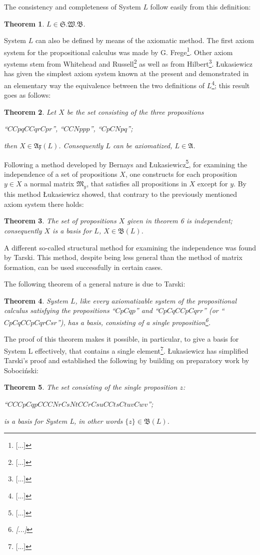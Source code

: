 \documentclass{article}
\newtheorem{theorem}{Theorem}
\theoremstyle{definition}
\begin{document}
The consistency and completeness of System $L$ follow easily from this definition:
\begin{theorem}
  $L\in\mathfrak{S}.\mathfrak{W}.\mathfrak{B}$.
\end{theorem}

System $L$ can also be defined by means of the axiomatic method. The first axiom system for the propositional calculus was made by G. Frege\footnote{[...]}. Other axiom systems stem from Whitehead and Russell\footnote{[...]} as well as from Hilbert\footnote{[...]}. Łukasiewicz has given the simplest axiom system known at the present and demonstrated in an elementary way the equivalence between the two definitions of $L$\footnote{[...]}; this result goes as follows:
\begin{theorem}
  Let $X$ be the set consisting of the three propositions
  \begin{center}``$CCpqCCqrCpr$'', \;``$CCNppp$'', \;``$CpCNpq$'';\end{center}
  then $X\in\mathfrak{Ax}(L)$. Consequently $L$ can be axiomatized, $L\in\mathfrak{A}$.
\end{theorem}

Following a method developed by Bernays and Łukasiewicz\footnote{[...]}, for examining the independence of a set of propositions $X$, one constructs for each proposition $y\in X$ a normal matrix $\mathfrak{M}_y$, that satisfies all propositions in $X$ except for $y$. By this method Łukasiewicz showed, that contrary to the previously mentioned axiom system there holds:
\begin{theorem}
  The set of propositions $X$ given in theorem 6 is independent; consequently $X$ is a basis for $L$, $X\in\mathfrak{B}(L)$.
\end{theorem}

A different so-called structural method for examining the independence was found by Tarski. This method, despite being less general than the method of matrix formation, can be used successfully in certain cases.

The following theorem of a general nature is due to Tarski:
\begin{theorem}
  System $L$, like every axiomatizable system of the propositional calculus satisfying the propositions ``$CpCqp$'' and ``$CpCqCCpCqrr$'' (or ``$CpCqCCpCqrCsr$''), has a basis, consisting of a single proposition\footnote{[...]}.
\end{theorem}

The proof of this theorem makes it possible, in particular, to give a basis for System L effectively, that contains a single element\footnote{[...]}. Łukasiewicz has simplified Tarski's proof and established the following by building on preparatory work by Sobociński:
\begin{theorem}  %
  The set consisting of the single proposition $z$:
  \begin{center}``$CCCpCqpCCCNrCsNtCCrCsuCCtsCtuvCwv$'';\end{center}
  is a basis for System L, in other words $\{z\}\in\mathfrak{B}(L)$.
\end{theorem}
\end{document}
